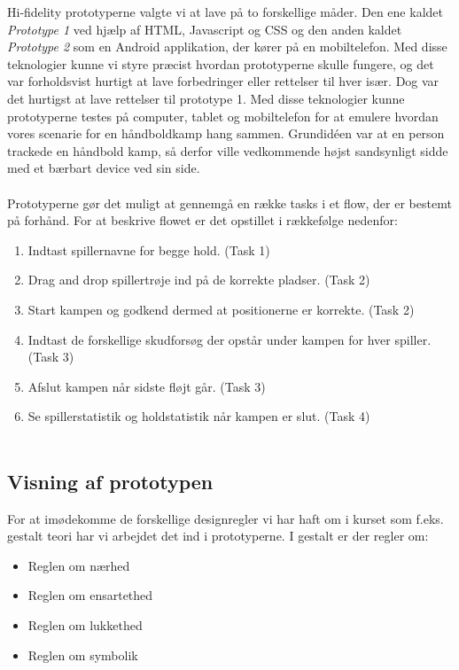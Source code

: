 Hi-fidelity prototyperne valgte vi at lave på to forskellige måder. Den ene kaldet \emph{Prototype 1} ved hjælp af HTML, Javascript og CSS og den anden kaldet \emph{Prototype 2} som en Android applikation, der kører på en mobiltelefon. Med disse teknologier kunne vi styre præcist hvordan prototyperne skulle fungere, og det var forholdsvist hurtigt at lave forbedringer eller rettelser til hver især. Dog var det hurtigst at lave rettelser til prototype 1. Med disse teknologier kunne prototyperne testes på computer, tablet og mobiltelefon for at emulere hvordan vores scenarie for en håndboldkamp hang sammen. Grundidéen var at en person trackede en håndbold kamp, så derfor ville vedkommende højst sandsynligt sidde med et bærbart device ved sin side.\\\\Prototyperne gør det muligt at gennemgå en række tasks i et flow, der er bestemt på forhånd. For at beskrive flowet er det opstillet i rækkefølge nedenfor:
\begin{enumerate}
\item Indtast spillernavne for begge hold. (Task 1)
\item Drag and drop spillertrøje ind på de korrekte pladser. (Task 2)
\item Start kampen og godkend dermed at positionerne er korrekte. (Task 2)
\item Indtast de forskellige skudforsøg der opstår under kampen for hver spiller. (Task 3)
\item Afslut kampen når sidste fløjt går. (Task 3)
\item Se spillerstatistik og holdstatistik når kampen er slut. (Task 4)\\\\
\end{enumerate} 

\newpage
\subsection*{Visning af prototypen}
For at imødekomme de forskellige designregler vi har haft om i kurset som f.eks. gestalt teori har vi arbejdet det ind i prototyperne. I gestalt er der regler om:
\begin{itemize}
\item Reglen om nærhed
\item Reglen om ensartethed
\item Reglen om lukkethed
\item Reglen om symbolik\\
\end{itemize}

